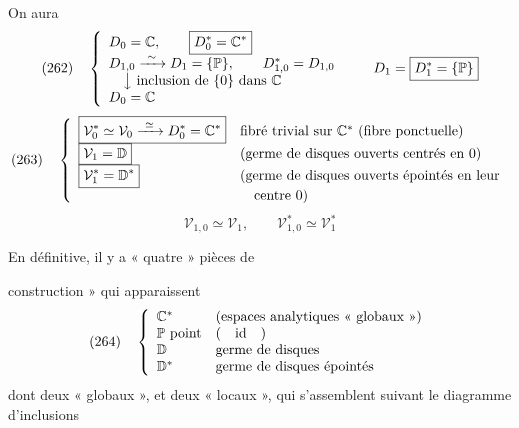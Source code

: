 \documentclass[11pt,a4paper]{article}
\begin{document}
On aura 
\[ (262)\quad \left\{\begin{array}{l} D_0=\mathbb{C},\qquad \boxed{D_0^*=\mathbb{C}^*}\\[2pt] D_{1,0}\xrightarrow{\ \sim\ } D_1=\{\mathbb{P}\},\qquad D_{1,0}^*=D_{1,0}\\ \quad\big\downarrow\ \text{inclusion de $\{0\}$ dans $\mathbb{C}$}\\ D_0=\mathbb{C} \end{array}\right. \qquad D_1=\boxed{D_1^*=\{\mathbb{P}\}} \]
\[ (263)\quad \left\{\begin{array}{ll} \boxed{\mathcal{V}_0^*\simeq\mathcal{V}_0\xrightarrow{\ \simeq\ } D_0^*=\mathbb{C}^*} & \text{fibré trivial sur $\mathbb{C}^*$ (fibre ponctuelle)}\\ \boxed{\mathcal{V}_1=\mathbb{D}} & \text{(germe de disques ouverts centrés en 0)}\\ \boxed{\mathcal{V}_1^*=\mathbb{D}^*} & \text{(germe de disques ouverts épointés en leur}\\ & \text{\quad centre 0)} \end{array}\right. \]
\[ \mathcal{V}_{1,0}\simeq\mathcal{V}_1,\qquad \mathcal{V}_{1,0}^*\simeq\mathcal{V}_1^* \]

En définitive, il y a « quatre » pièces de

construction » qui apparaissent
\[ (264)\quad \left\{\begin{array}{ll} \mathbb{C}^* & \text{(espaces analytiques « globaux »)}\\ \mathbb{P}\ \text{point} & \text{(\quad id\quad)}\\ \mathbb{D} & \text{germe de disques}\\ \mathbb{D}^* & \text{germe de disques épointés} \end{array}\right. \]
dont deux « globaux », et deux « locaux », qui s'assemblent suivant le diagramme d'inclusions
\end{document}
